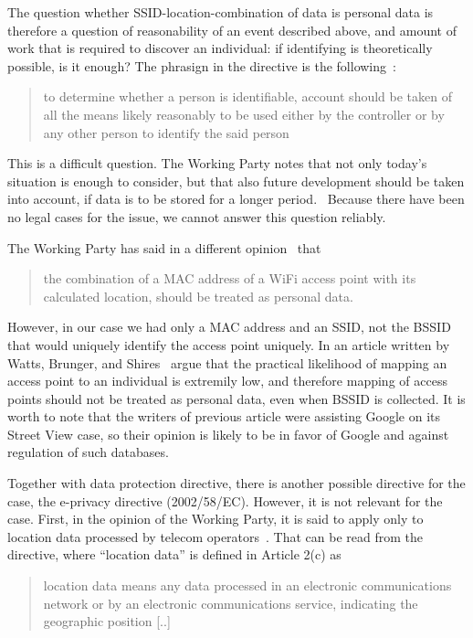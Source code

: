 \documentclass[12pt,a4paper,oneside,pdftex]{report}
\begin{document}
The question whether SSID-location-combination of data is personal data is therefore a question of reasonability of an event described above, and amount of work that is required to discover an individual: if identifying is theoretically possible, is it enough? The phrasign in the directive is the following~\cite{data_protection}:

\begin{quote}
    to determine whether a person is identifiable, account should be taken of all the means likely reasonably to be used either by the controller or by any other person to identify the said person
\end{quote}

This is a difficult question. The Working Party notes that not only today's situation is enough to consider, but that also future development should be taken into account, if data is to be stored for a longer period.~\cite{wp29_136} Because there have been no legal cases for the issue, we cannot answer this question reliably.

The Working Party has said in a different opinion~\cite{wp29_185} that 
\begin{quote}
    the combination of a MAC address of a WiFi access point with its calculated location, should be treated as personal data.
\end{quote}

However, in our case we had only a MAC address and an SSID, not the BSSID that would uniquely identify the access point uniquely. In an article written by Watts, Brunger, and Shires~\cite{watts2011european} argue that the practical likelihood of mapping an access point to an individual is extremily low, and therefore mapping of access points should not be treated as personal data, even when BSSID is collected. It is worth to note that the writers of previous article were assisting Google on its Street View case, so their opinion is likely to be in favor of Google and against regulation of such databases.

Together with data protection directive, there is another possible directive for the case, the e-privacy directive (2002/58/EC). However, it is not relevant for the case. First, in the opinion of the Working Party, it is said to apply only to location data processed by telecom operators~\cite{wp29_185}. That can be read from the directive, where ``location data'' is defined in Article 2(c) as

\begin{quote}
    location data means any data processed in an electronic communications network or by an electronic communications service, indicating the geographic position [..]
\end{quote} 
\end{document}
